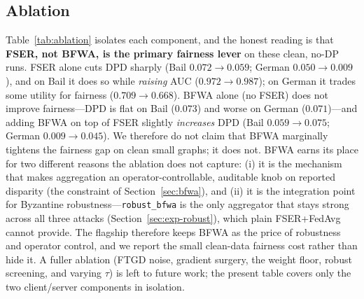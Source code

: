 \documentclass[pdflatex,sn-mathphys-num]{sn-jnl}
\theoremstyle{thmstyleone}%
\theoremstyle{thmstyletwo}%
\theoremstyle{thmstylethree}%
\begin{document}
\begin{table}[t]\centering\small
\caption{Demographic Parity Difference (DPD, lower is fairer).}
\label{tab:main-dpd}
{\footnotesize\setlength{\tabcolsep}{3pt}}
\end{table}

\begin{table}[t]\centering\small
\caption{Equal Opportunity Difference (EOD, lower is fairer).}
\label{tab:main-eod}
{\footnotesize\setlength{\tabcolsep}{3pt}}
\end{table}

\subsection{Ablation}
\label{sec:exp-ablation}
Table~\ref{tab:ablation} isolates each component, and the honest reading is that
\textbf{FSER, not BFWA, is the primary fairness lever} on these clean, no-DP
runs. FSER alone cuts DPD sharply (Bail $0.072\!\to\!0.059$; German
$0.050\!\to\!0.009$), and on Bail it does so while \emph{raising} AUC
($0.972\!\to\!0.987$); on German it trades some utility for fairness
($0.709\!\to\!0.668$). BFWA alone (no FSER) does not improve fairness---DPD is
flat on Bail ($0.073$) and worse on German ($0.071$)---and adding BFWA on top of
FSER slightly \emph{increases} DPD (Bail $0.059\!\to\!0.075$; German
$0.009\!\to\!0.045$). We therefore do not claim that BFWA marginally tightens the
fairness gap on clean small graphs; it does not. BFWA earns its place for two
different reasons the ablation does not capture: (i) it is the mechanism that
makes aggregation an operator-controllable, auditable knob on reported disparity
(the constraint of Section~\ref{sec:bfwa}), and (ii) it is the integration point
for Byzantine robustness---\texttt{robust\_bfwa} is the only aggregator that
stays strong across all three attacks (Section~\ref{sec:exp-robust}), which plain
FSER+FedAvg cannot provide. The flagship therefore keeps BFWA as the price of
robustness and operator control, and we report the small clean-data fairness cost
rather than hide it. A fuller ablation (FTGD noise, gradient surgery, the weight
floor, robust screening, and varying $\tau$) is left to future work; the present
table covers only the two client/server components in isolation.

\begin{table}[t]\centering\small
\caption{Ablation of TrustFedGNN components (no DP). AUC / DPD per dataset.}
\label{tab:ablation}

\end{table}
\end{document}

